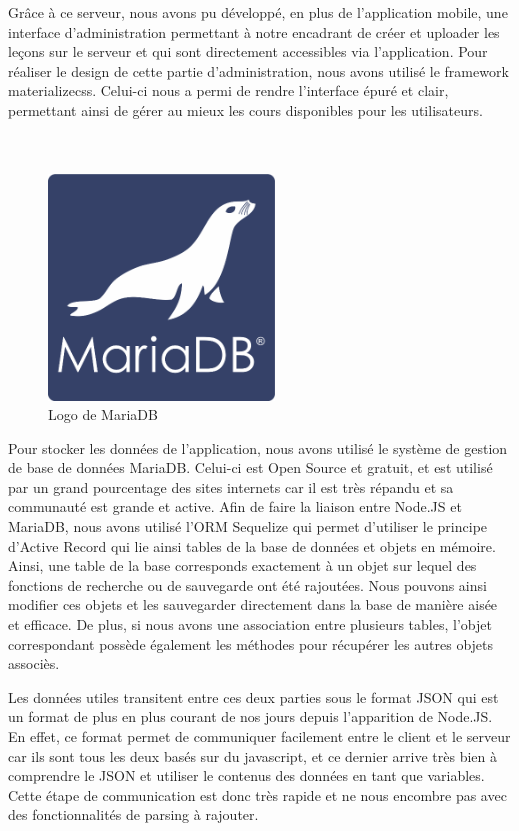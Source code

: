 \documentclass[pidr]{tnreport}
\begin{document}
Grâce à ce serveur, nous avons pu développé, en plus de l’application mobile, une interface d’administration permettant à notre encadrant de créer et uploader les leçons sur le serveur et qui sont directement accessibles via l’application. Pour réaliser le design de cette partie d’administration, nous avons utilisé le framework materializecss. Celui-ci nous a permi de rendre l’interface épuré et clair, permettant ainsi de gérer au mieux les cours disponibles pour les utilisateurs.
\\
\\
\\
\begin{figure}
  \centering
  \includegraphics[width=6cm]{figures/mariadb}
  \caption{Logo de MariaDB}
  \label{fig:logo-mariadb}
\end{figure}

Pour stocker les données de l’application, nous avons utilisé le système de gestion de base de données MariaDB. Celui-ci est Open Source et gratuit, et est utilisé par un grand pourcentage des sites internets car il est très répandu et sa communauté est grande et active. Afin de faire la liaison entre Node.JS et MariaDB, nous avons utilisé l’ORM Sequelize qui permet d’utiliser le principe d’Active Record qui lie ainsi tables de la base de données et objets en mémoire. Ainsi, une table de la base corresponds exactement à un objet sur lequel des fonctions de recherche ou de sauvegarde ont été rajoutées. Nous pouvons ainsi modifier ces objets et les sauvegarder directement dans la base de manière aisée et efficace. De plus, si nous avons une association entre plusieurs tables, l’objet correspondant possède également les méthodes pour récupérer les autres objets associès.




Les données utiles transitent entre ces deux parties sous le format JSON qui est un format de plus en plus courant de nos jours depuis l’apparition de Node.JS. En effet, ce format permet de communiquer facilement entre le client et le serveur car ils sont tous les deux basés sur du javascript, et ce dernier arrive très bien à comprendre le JSON et utiliser le contenus des données en tant que variables. Cette étape de communication est donc très rapide et ne nous encombre pas avec des fonctionnalités de parsing à rajouter.
\end{document}

